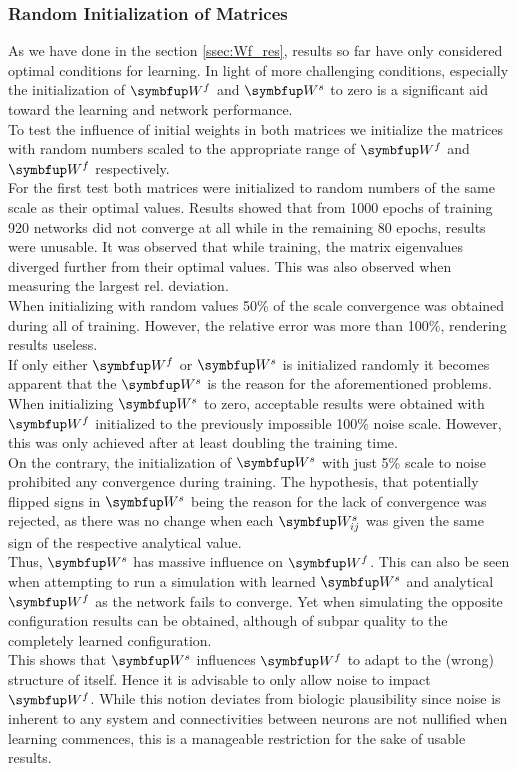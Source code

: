 \subsubsection{Random Initialization of Matrices}\label{sssec:rand_init}
As we have done in the section \cref{ssec:Wf_res}, results so far have only considered optimal conditions for learning. In light of more challenging conditions, especially the initialization of $\bmu{W}^f$ and $\bmu{W}^s$ to zero is a significant aid toward the learning and network performance.\\
To test the influence of initial weights in both matrices we initialize the matrices with random numbers scaled to the appropriate range of $\bmu{W}^f$ and $\bmu{W}^f$ respectively.\\
For the first test both matrices were initialized to random numbers of the same scale as their optimal values. Results showed that from 1000 epochs of training 920 networks did not converge at all while in the remaining 80 epochs, results were unusable. It was observed that while training, the matrix eigenvalues diverged further from their optimal values. This was also observed when measuring the largest rel. deviation.\\
When initializing with random values 50\% of the scale convergence was obtained during all of training. However, the relative error was more than 100\%, rendering results useless.\\
If only either $\bmu{W}^f$ or $\bmu{W}^s$ is initialized randomly it becomes apparent that the $\bmu{W}^s$ is the reason for the aforementioned problems. When initializing $\bmu{W}^s$ to zero, acceptable results were obtained with $\bmu{W}^f$ initialized to the previously impossible 100\% noise scale. However, this was only achieved after at least doubling the training time.\\
On the contrary, the initialization of $\bmu{W}^s$ with just 5\% scale to noise prohibited any convergence during training. The hypothesis, that potentially flipped signs in $\bmu{W}^s$ being the reason for the lack of convergence was rejected, as there was no change when each $\bmu{W}^s_{ij}$ was given the same sign of the respective analytical value.\\
Thus, $\bmu{W}^s$ has massive influence on $\bmu{W}^f$. This can also be seen when attempting to run a simulation with learned $\bmu{W}^s$ and analytical $\bmu{W}^f$ as the network fails to converge. Yet when simulating the opposite configuration results can be obtained, although of subpar quality to the completely learned configuration.\\
This shows that $\bmu{W}^s$ influences $\bmu{W}^f$ to adapt to the (wrong) structure of itself. Hence it is advisable to only allow noise to impact $\bmu{W}^f$. While this notion deviates from biologic plausibility since noise is inherent to any system and connectivities between neurons are not nullified when learning commences, this is a manageable restriction for the sake of usable results.

